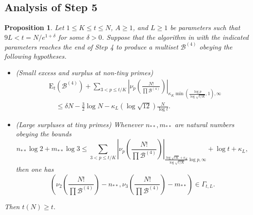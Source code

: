 \documentclass[12pt,a4paper,reqno]{amsart}
\numberwithin{equation}{section}
\theoremstyle{plain}
\newtheorem{proposition}[theorem]{Proposition}
\theoremstyle{definition}
\newcommand\tuple{{\mathcal B}}
\newcommand\excess{{\mathrm{E}}}
\begin{document}
\subsection{Analysis of Step 5}

\begin{proposition}\label{balance-23'}  Let $1 \leq K \leq t \leq N$, $A \geq 1$, and $L \geq 1$ be parameters such that $9L < t = N/e^{1+\delta}$ for some $\delta>0$.  Suppose that the algorithm in  with the indicated parameters reaches the end of Step 4 to produce a multiset $\tuple^{(4)}$ obeying the following hypotheses.
\begin{itemize}
\item[(i)] (Small excess and surplus at non-tiny primes)
\begin{equation}\label{new-balance-4}
  \begin{split}
&      \excess_t(\tuple^{(4)}) + \sum_{3 < p \leq t/K}
 \left|\nu_p\left(\frac{N!}{\prod \tuple^{(4)}}\right)\right|_{\kappa_K \min(\frac{\log p}{\log \sqrt{t/K}},1),\infty} \\
&\quad    \leq \delta N - \frac{3}{2} \log N - \kappa_L (\log \sqrt{12}) \frac{N}{\log t}.
  \end{split}
 \end{equation}
 \item[(ii)] (Large surpluses at tiny primes) Whenever $n_{**}, m_{**}$ are natural numbers obeying the  bounds
 $$ n_{**} \log 2 + m_{**} \log 3 \leq 
 \sum_{3 < p \leq t/K}
 \left|\nu_p\left(\frac{N!}{\prod \tuple^{(4)}}\right)\right|_{\frac{\log \sqrt{tK} + \kappa_K}{\log\sqrt{t/K}} \log p,\infty}
 + \log t + \kappa_L,$$
 then one has
 $$\left( \nu_2\left(\frac{N!}{\prod \tuple^{(4)}}\right) - n_{**}, \nu_3\left(\frac{N!}{\prod \tuple^{(4)}}\right) - m_{**}\right) \in \Gamma_{t,L}.$$
 \end{itemize}
  Then $t(N) \geq t$.
\end{proposition}
\end{document}
